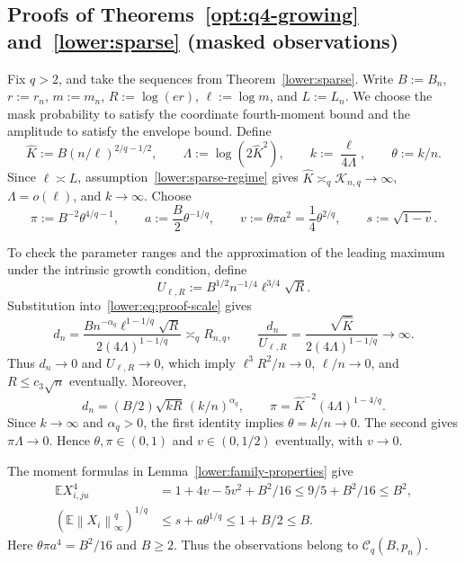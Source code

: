 \documentclass[11pt,letterpaper]{article}
\newenvironment{vSixBlock}{\color{magenta}}{}
\theoremstyle{remark}
\newcommand{\E}{\mathbb E}
\newcommand{\norm}[1]{\left\lVert#1\right\rVert}
\begin{document}
\begin{vSixBlock}
\subsection{Proofs of Theorems~\ref*{opt:q4-growing} and~\ref*{lower:sparse} (masked observations)}
\label{app:q4-growing}

Fix \(q>2\), and take the sequences from
Theorem~\ref{lower:sparse}. Write \(B:=B_n\), \(r:=r_n\),
\(m:=m_n\), \(R:=\log(er)\), \(\ell:=\log m\), and
\(L:=L_n\). We choose the mask probability to satisfy the
coordinate fourth-moment bound and the amplitude to satisfy the
envelope bound. Define
\[
 \widehat K:=B(n/\ell)^{2/q-1/2},\qquad
 \Lambda:=\log(2\widehat K^2),\qquad
 k:=\frac{\ell}{4\Lambda},\qquad \theta:=k/n.
\]
Since \(\ell\asymp L\), assumption~\eqref{lower:sparse-regime}
gives \(\widehat K\asymp_q\mathcal K_{n,q}\to\infty\),
\(\Lambda=o(\ell)\), and \(k\to\infty\). Choose
\begin{equation}
 \pi:=B^{-2}\theta^{4/q-1},\qquad
 a:=\frac B2\theta^{-1/q},\qquad
 v:=\theta\pi a^2=\frac14\theta^{2/q},\qquad s:=\sqrt{1-v}.
 \label{q4:eq:sparse-parameters}
\end{equation}

To check the parameter ranges and the approximation of the leading
maximum under the intrinsic growth condition, define
\[
 U_{\ell,R}:=B^{1/2}n^{-1/4}\ell^{3/4}\sqrt R.
\]
Substitution into~\eqref{lower:eq:proof-scale} gives
\[
 d_n=\frac{B n^{-\alpha_q}\ell^{1-1/q}\sqrt R}
 {2(4\Lambda)^{1-1/q}}\asymp_q R_{n,q},\qquad
 \frac{d_n}{U_{\ell,R}}
 =\frac{\sqrt{\widehat K}}{2(4\Lambda)^{1-1/q}}\to\infty.
\]
Thus \(d_n\to0\) and \(U_{\ell,R}\to0\), which imply
\(\ell^3R^2/n\to0\), \(\ell/n\to0\), and
\(R\le c_3\sqrt n\) eventually. Moreover,
\[
 d_n=(B/2)\sqrt{kR}\,(k/n)^{\alpha_q},\qquad
 \pi=\widehat K^{-2}(4\Lambda)^{1-4/q}.
\]
Since \(k\to\infty\) and \(\alpha_q>0\), the first identity
implies \(\theta=k/n\to0\). The second gives
\(\pi\Lambda\to0\). Hence \(\theta,\pi\in(0,1)\) and
\(v\in(0,1/2)\) eventually, with \(v\to0\).

The moment formulas in Lemma~\ref{lower:family-properties} give
\begin{align}
 \E X_{i,ju}^4
 &=1+4v-5v^2+B^2/16\le9/5+B^2/16\le B^2,
 \label{q4:eq:sparse-coordinate-moments}\\
 (\E\norm{X_i}_\infty^q)^{1/q}
 &\le s+a\theta^{1/q}\le1+B/2\le B.
 \label{q4:eq:sparse-envelope-moment}
\end{align}
Here \(\theta\pi a^4=B^2/16\) and \(B\ge2\).
Thus the observations belong to \(\mathcal C_q(B,p_n)\).


\end{vSixBlock}
\end{document}
